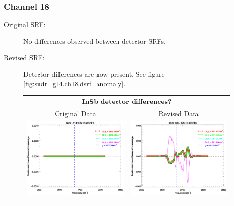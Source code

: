 \subsubsection{Channel 18}
\begin{description}
  \item[Original SRF:] No differences observed between detector SRFs.
  \item[Revised SRF:]  Detector differences are now present. See figure \ref{fig:sndr_g14.ch18.dsrf_anomaly}.
\end{description}

\begin{figure}[htp]
  \centering
  \begin{tabular}{c c}
    \multicolumn{2}{c}{\textsf{\bfseries InSb detector differences?}} \\
    \hspace{1.5em}\textsf{Original Data} &
    \hspace{1.5em}\textsf{Revised Data} \\
    \includegraphics[scale=0.5,trim=0 40 0 0]{graphics/dsrf_anomaly/original/sndr_g14.ch18.srf.eps} &
    \includegraphics[scale=0.5,trim=0 40 0 0]{graphics/dsrf_anomaly/revised/sndr_g14.ch18.srf.eps} \\\\

\end{tabular}
\end{figure}
